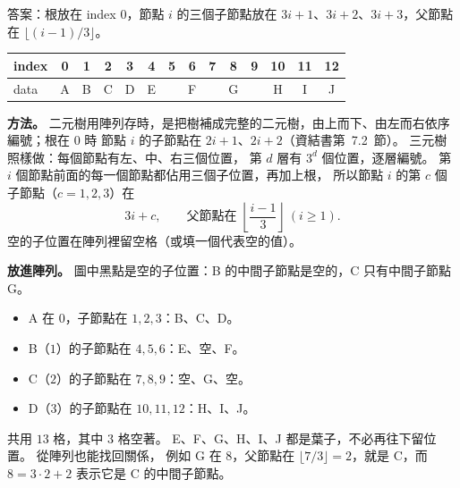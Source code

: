 \begin{pastsoln}
答案：根放在 index $0$，節點 $i$ 的三個子節點放在 $3i+1$、$3i+2$、$3i+3$，父節點在 $\lfloor (i-1)/3 \rfloor$。
\begin{center}
\begin{tabular}{|l|*{13}{c|}}
\hline
index & 0 & 1 & 2 & 3 & 4 & 5 & 6 & 7 & 8 & 9 & 10 & 11 & 12 \\ \hline
data & A & B & C & D & E & & F & & G & & H & I & J \\ \hline
\end{tabular}
\end{center}

\textbf{方法。} 二元樹用陣列存時，是把樹補成完整的二元樹，由上而下、由左而右依序編號；根在 $0$ 時
節點 $i$ 的子節點在 $2i+1$、$2i+2$（資結書第~7.2~節）。 三元樹照樣做：每個節點有左、中、右三個位置，
第 $d$ 層有 $3^{d}$ 個位置，逐層編號。 第 $i$ 個節點前面的每一個節點都佔用三個子位置，再加上根，
所以節點 $i$ 的第 $c$ 個子節點（$c = 1, 2, 3$）在
\[
3i + c,\qquad \text{父節點在 } \left\lfloor \frac{i - 1}{3} \right\rfloor \ (i \ge 1).
\]
空的子位置在陣列裡留空格（或填一個代表空的值）。

\textbf{放進陣列。} 圖中黑點是空的子位置：B 的中間子節點是空的，C 只有中間子節點 G。
\begin{itemize}
\item A 在 $0$，子節點在 $1, 2, 3$：B、C、D。
\item B（$1$）的子節點在 $4, 5, 6$：E、空、F。
\item C（$2$）的子節點在 $7, 8, 9$：空、G、空。
\item D（$3$）的子節點在 $10, 11, 12$：H、I、J。
\end{itemize}
共用 $13$ 格，其中 $3$ 格空著。 E、F、G、H、I、J 都是葉子，不必再往下留位置。 從陣列也能找回關係，
例如 G 在 $8$，父節點在 $\lfloor 7/3 \rfloor = 2$，就是 C，而 $8 = 3 \cdot 2 + 2$ 表示它是 C 的中間子節點。
\end{pastsoln}
